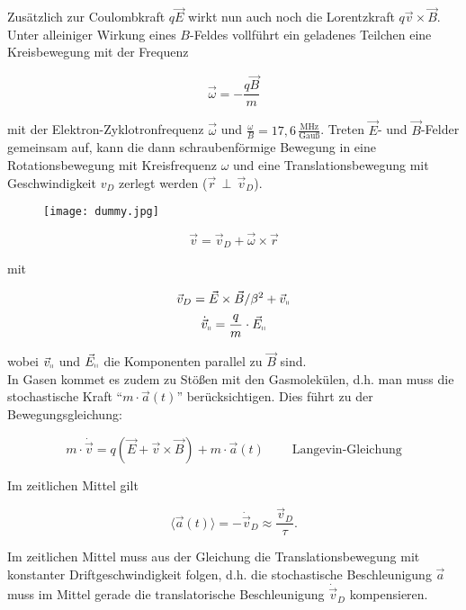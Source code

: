 Zusätzlich zur Coulombkraft $q\vec{E}$ wirkt nun auch noch die Lorentzkraft $q\vec{v}\times
\vec{B}$. Unter alleiniger Wirkung eines $B$-Feldes vollführt ein geladenes Teilchen eine
Kreisbewegung mit der Frequenz

\[\vec{\omega} = -\frac{q\vec{B}}{m}\]

mit der Elektron-Zyklotronfrequenz $\vec{\omega}$ und
$\frac{\omega}{B}=17{,}6\,\frac{\text{MHz}}{\text{Gauß}}$. Treten $\vec{E}$- und $\vec{B}$-Felder
gemeinsam auf, kann die dann schraubenförmige Bewegung in eine Rotationsbewegung mit Kreisfrequenz
$\omega$ und eine Translationsbewegung mit Geschwindigkeit $v_D$ zerlegt werden
($\vec{r}\,\perp\,\vec{v}_D$). 

\begin{figure}[H]
	\centering
	\texttt{[image: dummy.jpg]}
\end{figure}

\[ \vec{v}= \vec{v}_D + \vec{\omega}\times\vec{r} \]
 
 mit
 
 \[\vec{v}_D=\vec{E}\times \vec{B}/\beta^2 +\vec{v}_\shortparallel  \]
 \[\dot{\vec{v}}_\shortparallel = \frac{q}{m} \cdot\vec{E}_\shortparallel\]
 
 wobei $\vec{v}_\shortparallel$ und $\vec{E}_\shortparallel$ die Komponenten parallel zu $\vec{B}$
 sind.
 \\
 In Gasen kommet es zudem zu Stößen mit den Gasmolekülen, d.h. man muss die stochastische Kraft
 "`$m\cdot\vec{a}(t)$"' berücksichtigen. Dies führt zu der Bewegungsgleichung:
 
 \[m\cdot \dot{\vec{v}} = q\left( \vec{E}+\vec{v}\times\vec{B} \right) +m\cdot
 \vec{a}(t)~~~~~~~~~~\text{Langevin-Gleichung} \]

 Im zeitlichen Mittel gilt
 
 \[\langle \vec{a}(t) \rangle = - \dot{\vec{v}}_D  \approx \frac{\vec{v}_D}{\tau}. \]
 
 Im zeitlichen Mittel muss aus der Gleichung die Translationsbewegung mit konstanter
 Driftgeschwindigkeit folgen, d.h. die stochastische Beschleunigung $\vec{a}$ muss im Mittel gerade
 die translatorische Beschleunigung $\dot{\vec{v}}_D$ kompensieren.
